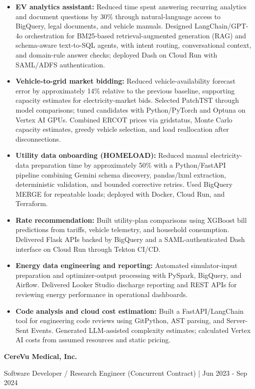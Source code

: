 \documentclass[letterpaper,11pt]{article}
\newcommand{\employer}[1]{\par\addvspace{3pt}\needspace{4\baselineskip}\textbf{#1}\par\nobreak}
\begin{document}
\begin{itemize}
\item \textbf{EV analytics assistant:} Reduced time spent answering recurring analytics and document questions by 30\% through natural-language access to BigQuery, legal documents, and vehicle manuals. Designed LangChain/GPT-4o orchestration for BM25-based retrieval-augmented generation (RAG) and schema-aware text-to-SQL agents, with intent routing, conversational context, and domain-rule answer checks; deployed Dash on Cloud Run with SAML/ADFS authentication.
\item \textbf{Vehicle-to-grid market bidding:} Reduced vehicle-availability forecast error by approximately 14\% relative to the previous baseline, supporting capacity estimates for electricity-market bids. Selected PatchTST through model comparisons; tuned candidates with Python/PyTorch and Optuna on Vertex AI GPUs. Combined ERCOT prices via gridstatus, Monte Carlo capacity estimates, greedy vehicle selection, and load reallocation after disconnections.
\item \textbf{Utility data onboarding (HOMELOAD):} Reduced manual electricity-data preparation time by approximately 50\% with a Python/FastAPI pipeline combining Gemini schema discovery, pandas/lxml extraction, deterministic validation, and bounded corrective retries. Used BigQuery MERGE for repeatable loads; deployed with Docker, Cloud Run, and Terraform.
\item \textbf{Rate recommendation:} Built utility-plan comparisons using XGBoost bill predictions from tariffs, vehicle telemetry, and household consumption. Delivered Flask APIs backed by BigQuery and a SAML-authenticated Dash interface on Cloud Run through Tekton CI/CD.
\item \textbf{Energy data engineering and reporting:} Automated simulator-input preparation and optimizer-output processing with PySpark, BigQuery, and Airflow. Delivered Looker Studio discharge reporting and REST APIs for reviewing energy performance in operational dashboards.
\item \textbf{Code analysis and cloud cost estimation:} Built a FastAPI/LangChain tool for engineering code reviews using GitPython, AST parsing, and Server-Sent Events. Generated LLM-assisted complexity estimates; calculated Vertex AI costs from assumed resources and static pricing.
\end{itemize}
\employer{CereVu Medical, Inc.}
Software Developer / Research Engineer (Concurrent Contract) | Jun 2023 - Sep 2024\par
\end{document}

